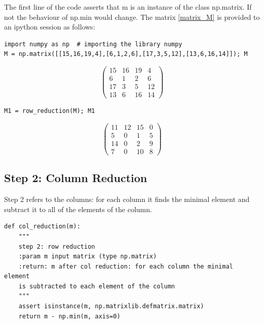 \documentclass[12pt]{ClasseMatematicamente}
\begin{document}
\noindent
The first line of the code asserts that m is an instance of the class np.matrix. If not the behaviour of np.min would change.
The matrix \ref{matrix_M} is provided to an ipython session as follows:
\begin{small}
\begin{lstlisting}
import numpy as np  # importing the library numpy 
M = np.matrix([[15,16,19,4],[6,1,2,6],[17,3,5,12],[13,6,16,14]]); M
\end{lstlisting}
\end{small}
$$
\left(\begin{array}{rrrr}
15 & 16 & 19 & 4 \\
6 & 1 & 2 & 6 \\
17 & 3 & 5 & 12 \\
13 & 6 & 16 & 14
\end{array}\right)
$$
\begin{small}
 \begin{verbatim}
M1 = row_reduction(M); M1
\end{verbatim}
\end{small}
$$
\left(\begin{array}{rrrr}
11 & 12 & 15 & 0 \\
5 & 0 & 1 & 5 \\
14 & 0 & 2 & 9 \\
7 & 0 & 10 & 8
\end{array}\right)
$$

\subsection*{Step 2: Column Reduction}
Step 2 refers to the columns: for each column it finds the minimal element and subtract it to all of the elements of the column. 

\begin{small}
\begin{lstlisting}
def col_reduction(m):
	"""
	step 2: row reduction
	:param m input matrix (type np.matrix)
	:return: m after col reduction: for each column the minimal element 
	is subtracted to each element of the column
	"""
	assert isinstance(m, np.matrixlib.defmatrix.matrix)
	return m - np.min(m, axis=0)
\end{lstlisting}
\end{small}
\end{document}

